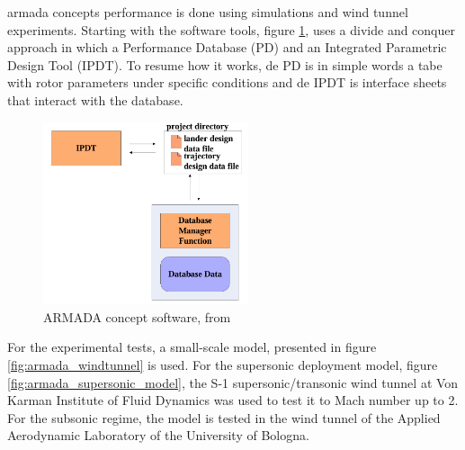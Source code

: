 \gls{armada} concepts performance is done using simulations and wind tunnel experiments. Starting with the software tools, figure \ref{fig:armada_software}, uses a divide and conquer approach in which a Performance Database (PD) and an Integrated Parametric Design  Tool (IPDT). To resume how it works, de PD is in simple words a tabe with rotor parameters under specific conditions and de IPDT is interface sheets that interact with the database.

\begin{figure}[!htb]
    \centering
    \includegraphics[width=6cm]{Figures/literature_review/armada_software.png}
    \caption{ARMADA concept software, from \cite{noauthor_armada_nodate} }
    \label{fig:armada_software}
\end{figure}

For the experimental tests, a small-scale model, presented in figure \ref{fig:armada_windtunnel} is used. For the supersonic deployment model, figure \ref{fig:armada_supersonic_model}, the S-1 supersonic/transonic wind tunnel 
at Von Karman Institute of Fluid Dynamics was used to test it to Mach number up to 2. For the subsonic regime, the model is tested in the wind tunnel of the Applied Aerodynamic Laboratory of the University of Bologna.

